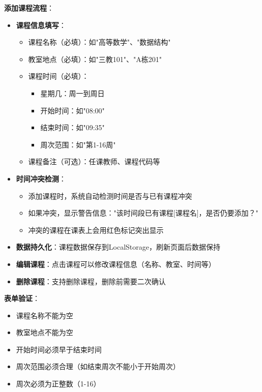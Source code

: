 \documentclass[12pt,a4paper]{article}
\begin{document}
\textbf{添加课程流程}：
\begin{itemize}
    \item \textbf{课程信息填写}：
        \begin{itemize}
            \item 课程名称（必填）：如"高等数学"、"数据结构"
            \item 教室地点（必填）：如"三教101"、"A栋201"
            \item 课程时间（必填）：
                \begin{itemize}
                    \item 星期几：周一到周日
                    \item 开始时间：如"08:00"
                    \item 结束时间：如"09:35"
                    \item 周次范围：如"第1-16周"
                \end{itemize}
            \item 课程备注（可选）：任课教师、课程代码等
        \end{itemize}
    \item \textbf{时间冲突检测}：
        \begin{itemize}
            \item 添加课程时，系统自动检测时间是否与已有课程冲突
            \item 如果冲突，显示警告信息："该时间段已有课程[课程名]，是否仍要添加？"
            \item 冲突的课程在课表上会用红色标记突出显示
        \end{itemize}
    \item \textbf{数据持久化}：课程数据保存到LocalStorage，刷新页面后数据保持
    \item \textbf{编辑课程}：点击课程可以修改课程信息（名称、教室、时间等）
    \item \textbf{删除课程}：支持删除课程，删除前需要二次确认
\end{itemize}

\textbf{表单验证}：
\begin{itemize}
    \item 课程名称不能为空
    \item 教室地点不能为空
    \item 开始时间必须早于结束时间
    \item 周次范围必须合理（如结束周次不能小于开始周次）
    \item 周次必须为正整数（1-16）
\end{itemize}
\end{document}
